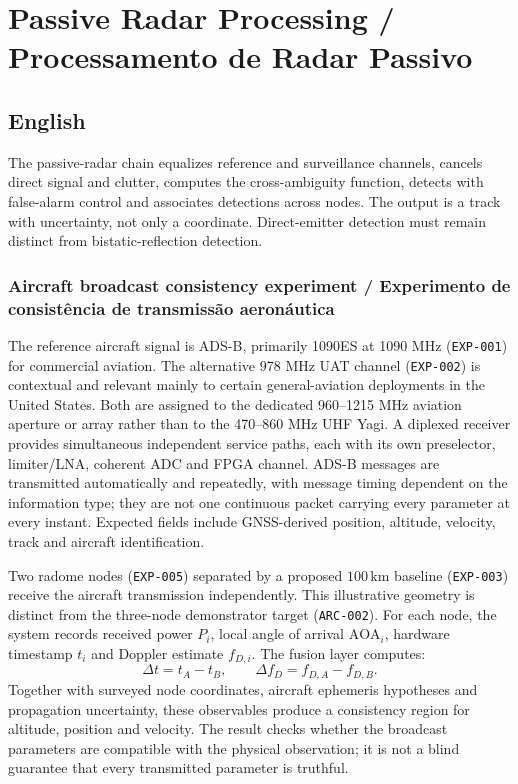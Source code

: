 \chapter{Passive Radar Processing / Processamento de Radar Passivo}

\section*{English}
The passive-radar chain equalizes reference and surveillance channels, cancels direct signal and clutter, computes the cross-ambiguity function, detects with false-alarm control and associates detections across nodes. The output is a track with uncertainty, not only a coordinate. Direct-emitter detection must remain distinct from bistatic-reflection detection.

\subsection*{Aircraft broadcast consistency experiment / Experimento de consistência de transmissão aeronáutica}
The reference aircraft signal is ADS-B, primarily 1090ES at 1090 MHz (\texttt{EXP-001}) for commercial aviation. The alternative 978 MHz UAT channel (\texttt{EXP-002}) is contextual and relevant mainly to certain general-aviation deployments in the United States. Both are assigned to the dedicated 960--1215 MHz aviation aperture or array rather than to the 470--860 MHz UHF Yagi. A diplexed receiver provides simultaneous independent service paths, each with its own preselector, limiter/LNA, coherent ADC and FPGA channel. ADS-B messages are transmitted automatically and repeatedly, with message timing dependent on the information type; they are not one continuous packet carrying every parameter at every instant. Expected fields include GNSS-derived position, altitude, velocity, track and aircraft identification.

Two radome nodes (\texttt{EXP-005}) separated by a proposed $100\,\mathrm{km}$ baseline (\texttt{EXP-003}) receive the aircraft transmission independently. This illustrative geometry is distinct from the three-node demonstrator target (\texttt{ARC-002}). For each node, the system records received power $P_i$, local angle of arrival $\mathrm{AOA}_i$, hardware timestamp $t_i$ and Doppler estimate $f_{D,i}$. The fusion layer computes:
\[
\Delta t=t_A-t_B,\qquad \Delta f_D=f_{D,A}-f_{D,B}.
\]
Together with surveyed node coordinates, aircraft ephemeris hypotheses and propagation uncertainty, these observables produce a consistency region for altitude, position and velocity. The result checks whether the broadcast parameters are compatible with the physical observation; it is not a blind guarantee that every transmitted parameter is truthful.

